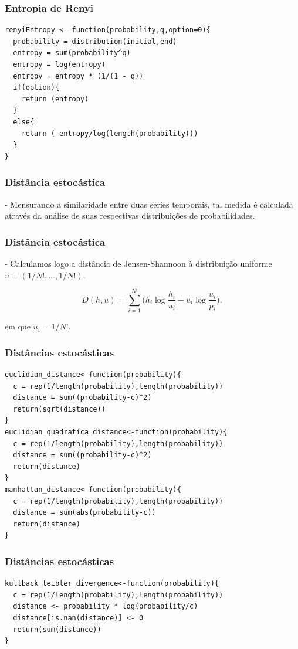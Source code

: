 \documentclass[10pt, compress]{beamer}
\begin{document}
\begin{frame}[fragile]
\frametitle{Entropia de Renyi}
 \begin{lstlisting}
renyiEntropy <- function(probability,q,option=0){
  probability = distribution(initial,end)  
  entropy = sum(probability^q)
  entropy = log(entropy)
  entropy = entropy * (1/(1 - q))
  if(option){
    return (entropy)
  }
  else{
    return ( entropy/log(length(probability)))
  }
}
\end{lstlisting}
\end{frame}
 
\begin{frame}[fragile]
\frametitle{ Distância estocástica}

- Mensurando a similaridade entre duas séries temporais, tal medida é calculada através da análise de suas respectivas distribuições de probabilidades.

\end{frame}

\begin{frame}[fragile]
\frametitle{ Distância estocástica}

- Calculamos logo a distância de Jensen-Shannoon à distribuição uniforme $ u=(1/N!,\dots,1/N!)$.

\begin{equation}
D( h, u) = \sum_{i=1}^{N!} \Big(h_i \log\frac{h_i}{u_i} +
u_i \log\frac{u_i}{p_i}
\Big),
\end{equation}

em que $u_i=1/N!$.
\end{frame}

\begin{frame}[fragile]
\frametitle{Distâncias estocásticas}
 \begin{lstlisting}
euclidian_distance<-function(probability){
  c = rep(1/length(probability),length(probability))
  distance = sum((probability-c)^2)
  return(sqrt(distance))
}
euclidian_quadratica_distance<-function(probability){
  c = rep(1/length(probability),length(probability))
  distance = sum((probability-c)^2)
  return(distance)
}
manhattan_distance<-function(probability){
  c = rep(1/length(probability),length(probability))
  distance = sum(abs(probability-c))
  return(distance)
}
\end{lstlisting}
\end{frame}


\begin{frame}[fragile]
\frametitle{Distâncias estocásticas}
 \begin{lstlisting}
kullback_leibler_divergence<-function(probability){
  c = rep(1/length(probability),length(probability))
  distance <- probability * log(probability/c)
  distance[is.nan(distance)] <- 0
  return(sum(distance))
}
\end{lstlisting}
\end{frame}
\end{document}

